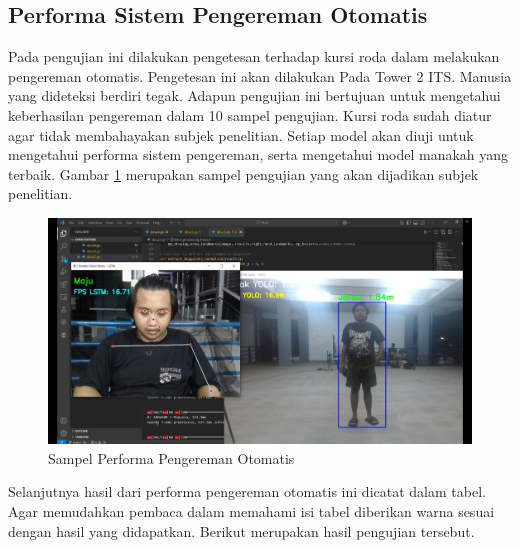 \newpage
\subsection{Performa Sistem Pengereman Otomatis}

Pada pengujian ini dilakukan pengetesan terhadap kursi roda dalam melakukan pengereman otomatis. Pengetesan ini akan dilakukan Pada Tower 2 ITS. Manusia yang dideteksi berdiri tegak. Adapun pengujian ini bertujuan untuk mengetahui keberhasilan pengereman dalam 10 sampel pengujian. Kursi roda sudah diatur agar tidak membahayakan subjek penelitian. Setiap model akan diuji untuk mengetahui performa sistem pengereman, serta mengetahui model manakah yang terbaik. Gambar \ref{fig:Fotoperforma} merupakan sampel pengujian yang akan dijadikan subjek penelitian.

\begin{figure} [H] \centering
  \includegraphics[scale=0.3]{gambar/performakeberhasilan.jpg}
  \caption{Sampel Performa Pengereman Otomatis}
  \label{fig:Fotoperforma}
\end{figure}

Selanjutnya hasil dari performa pengereman otomatis ini dicatat dalam tabel. Agar memudahkan pembaca dalam memahami isi tabel diberikan warna sesuai dengan hasil yang didapatkan. Berikut merupakan hasil pengujian tersebut.


